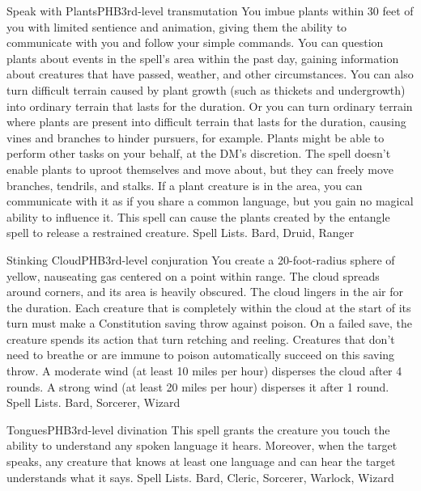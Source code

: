 \begin{spell}{Speak with Plants}{PHB}{3rd-level transmutation}
{
}
You imbue plants within 30 feet of you with limited sentience and animation, giving them the ability to communicate with you and follow your simple commands. You can question plants about events in the spell’s area within the past day, gaining information about creatures that have passed, weather, and other circumstances.
You can also turn difficult terrain caused by plant growth (such as thickets and undergrowth) into ordinary terrain that lasts for the duration. Or you can turn ordinary terrain where plants are present into difficult terrain that lasts for the duration, causing vines and branches to hinder pursuers, for example.
Plants might be able to perform other tasks on your behalf, at the DM’s discretion. The spell doesn’t enable plants to uproot themselves and move about, but they can freely move branches, tendrils, and stalks.
If a plant creature is in the area, you can communicate with it as if you share a common language, but you gain no magical ability to influence it.
This spell can cause the plants created by the entangle spell to release a restrained creature.
Spell Lists. Bard, Druid, Ranger
\end{spell}

\begin{spell}{Stinking Cloud}{PHB}{3rd-level conjuration}
{
}
You create a 20-foot-radius sphere of yellow, nauseating gas centered on a point within range. The cloud spreads around corners, and its area is heavily obscured. The cloud lingers in the air for the duration.
Each creature that is completely within the cloud at the start of its turn must make a Constitution saving throw against poison. On a failed save, the creature spends its action that turn retching and reeling. Creatures that don’t need to breathe or are immune to poison automatically succeed on this saving throw.
A moderate wind (at least 10 miles per hour) disperses the cloud after 4 rounds. A strong wind (at least 20 miles per hour) disperses it after 1 round.
Spell Lists. Bard, Sorcerer, Wizard
\end{spell}

\begin{spell}{Tongues}{PHB}{3rd-level divination}
{
}
This spell grants the creature you touch the ability to understand any spoken language it hears. Moreover, when the target speaks, any creature that knows at least one language and can hear the target understands what it says.
Spell Lists. Bard, Cleric, Sorcerer, Warlock, Wizard
\end{spell}

